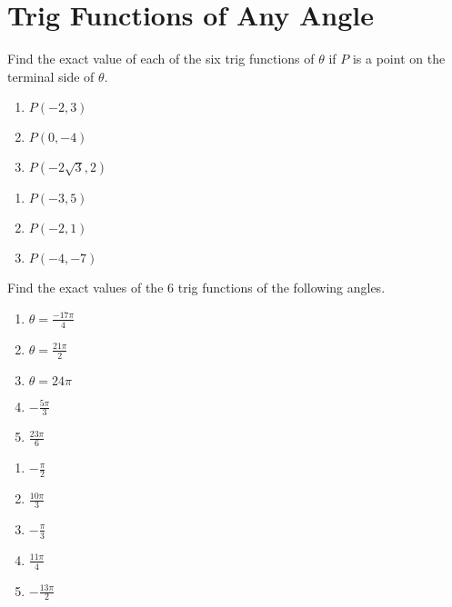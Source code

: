 \chapter{Trig Functions of Any Angle}

Find the exact value of each of the six trig functions of $\theta$ if $P$ is a point on the terminal side of $\theta$.

\begin{multicols}{3}
\begin{enumerate}
	\item $P(-2, 3)$
	\item $P(0,-4)$
	\item $P(-2\sqrt{3}, 2)$
\end{enumerate} \setcounter{Review}{\value{enumi}}
\end{multicols}
\begin{multicols}{3}
\begin{enumerate}	\setcounter{enumi}{\value{Review}}
	\item $P(-3, 5)$
	\item $P(-2, 1)$
	\item $P(-4, -7)$
\end{enumerate}	\setcounter{Review}{\value{enumi}}
\end{multicols}
\bigskip 

Find the exact values of the 6 trig functions of the following angles.

\begin{multicols}{5}
\begin{enumerate}		\setcounter{enumi}{\value{Review}}	
	\item $\theta = \frac{-17\pi}{4}$	
	\item $\theta = \frac{21\pi}{2}$	
	\item $\theta = 24\pi$  
	\item $-\frac{5\pi}{3}$	
    \item $\frac{23\pi}{6}$	
\end{enumerate} \setcounter{Review}{\value{enumi}}
\end{multicols}
\smallskip
\begin{multicols}{5}
\begin{enumerate}	\setcounter{enumi}{\value{Review}}
    \item $-\frac{\pi}{2}$
    \item $\frac{10\pi}{3}$
    \item $-\frac{\pi}{3}$
    \item $\frac{11\pi}{4}$
    \item $-\frac{13\pi}{2}$
\end{enumerate}
\end{multicols}

